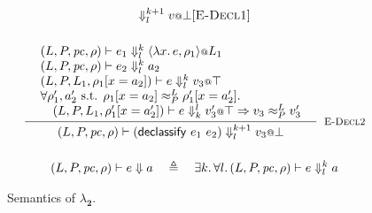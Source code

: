\documentclass{article}
\makeatletter
\theoremstyle{definition}
\newcommand{\at}{\ensuremath{{\scriptstyle{@}}}}
\newcommand{\pc}{\ensuremath{{\mathit{pc}}}}
\makeatother
\begin{document}
\begin{figure}[ht]
\begin{gather*}
{      \Downarrow^{k+1}_{l}
      v \at \bot
    }[\textsc{E-Decl1}]
    \\[3ex]
    \inference{
      {\begin{array}{l}
          (L, P, \pc, \rho) |-
          e_1
          \Downarrow^{k}_{l}
          \langle{\lambda{x}.\, e, \rho_1\rangle} \at L_1
          \\
          (L, P, \pc, \rho) |-
          e_2
          \Downarrow^{k}_{l}
          a_2
          \\
          (L, P, L_1, \rho_1[x = a_2]) |-
          e
          \Downarrow^{k}_{l}
          v_3 \at \top
          \\
          \forall{\rho_1', a_2' \text{ s.t. }
            \rho_1[x = a_2] \approx^{L}_{P} \rho_1'[x = a_2']}.
          \\\quad
          (L, P, L_1, \rho_1'[x = a_2']) |-
          e
          \Downarrow^{l}_{k}
          v_3' \at \top =>
          v_3 \approx^{L}_{P} v_3'
        \end{array}}
    }{
      (L, P, \pc, \rho) |-
      (\mathsf{declassify}\ e_1\ e_2)
      \Downarrow^{k+1}_{l}
      v_3 \at \bot
    }[\textsc{E-Decl2}]
    \\[3ex]
    (L, P, \pc, \rho) |-
    e
    \Downarrow
    a
    \quad \triangleq \quad
    \exists{k}.\, \forall{l}.\,
    (L, P, \pc, \rho) |-
    e
    \Downarrow^{k}_{l}
    a
  \end{gather*}
  \caption{Semantics of $\lambda_{\mathbf{2}}$.}
  \label{fig:semantics}
\end{figure}
\end{document}
